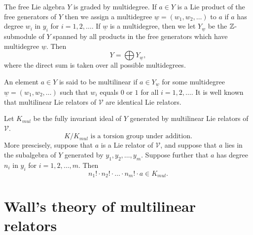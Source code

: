 \documentclass[12pt]{article}
\begin{document}
The free Lie algebra $Y$ is graded by multidegree. If $a\in Y$ is a Lie
product of the free generators of $Y$ then we assign a multidegree $%
\underline{w}=\left( w_1,w_2,\ldots \right) $ to $a$ if $a$ has degree $w_i$
in $y_i$ for $i=1,2,\ldots $. If $\underline{w}$ is a multidegree, then we
let $Y_{\underline{w}}$ be the $\Bbb{Z}$-submodule of $Y$ spanned by all
products in the free generators which have multidegree $\underline{w}$. Then 
\[
Y=\bigoplus Y_{\underline{w}}, 
\]
where the direct sum is taken over all possible multidegrees.

An element $a\in Y$ is said to be multilinear if $a\in Y_{\underline{w}}$
for some multidegree $\underline{w}=(w_1,w_2,\ldots )$ such that $w_i$
equals $0$ or $1$ for all $i=1,2,\ldots $. It is well known that multilinear
Lie relators of $\mathcal{V}$ are identical Lie relators. \bigskip

{\Large Let $K_{mul}$ be the fully invariant ideal of $Y$ generated by
multilinear Lie relators of $\mathcal{V}$. 
\[
K/K_{mul}\text{{\ is a torsion group under addition.}} 
\]
} \bigskip More prescisely, suppose that $a$ is a Lie relator of $\mathcal{V}
$, and suppose that $a$ lies in the subalgebra of $Y$ generated by $%
y_1,y_2,\ldots ,y_m$. Suppose further that $a$ has degree $n_i$ in $y_i$ for 
$i=1,2,\ldots ,m$. Then {\Large 
\[
n_1!\cdot n_2!\cdot \ldots \cdot n_m!\cdot a\in K_{mul}. 
\]
} \bigskip

\section{Wall's theory of multilinear relators}
\end{document}
